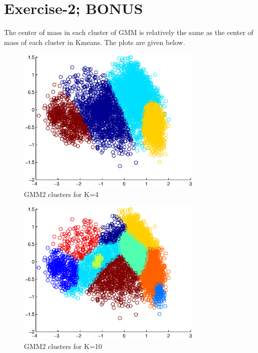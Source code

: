 \documentclass[a4paper]{article}
\begin{document}
\section*{Exercise-2; BONUS}
The center of mass in each cluster of GMM is relatively the same as the center of mass of each cluster in Kmeans. \newline
The plots are given below.
		\begin{figure}[H]
			\begin{center}
				\includegraphics[width=0.8\textwidth]{GMM_KMEANS_K4.eps}
				\caption{GMM2 clusters for K=4}\label{fig:gmm_kmeans_k4}
			\end{center}
		\end{figure}
		
		\begin{figure}[H]
			\begin{center}
				\includegraphics[width=0.8\textwidth]{GMM_KMEANS_K10.eps}
				\caption{GMM2 clusters for K=10}\label{fig:gmm_kmeans_k10}
			\end{center}
		\end{figure}
\end{document}
